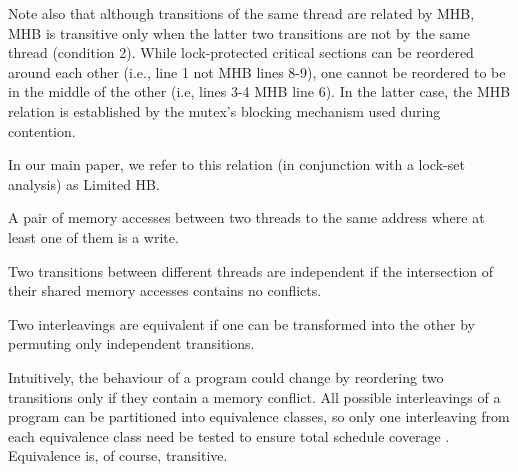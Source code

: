 Note also that although transitions of the same thread are related by MHB,
MHB is transitive only when the latter two transitions are not by the same thread (condition 2).
While lock-protected critical sections can be reordered around each other (i.e., line 1 not MHB lines 8-9),
one cannot be reordered to be in the middle of the other (i.e, lines 3-4 MHB line 6).
In the latter case, the MHB relation is established by the mutex's blocking mechanism used during contention.

In our main paper, we refer to this relation (in conjunction with a lock-set analysis) as Limited HB.

\begin{definition}
A pair of memory accesses between two threads to the same address where at least one of them is a write.
\end{definition}


\begin{definition}
Two transitions between different threads are independent if the intersection of their shared memory accesses contains no conflicts.
\end{definition}

\begin{definition}
Two interleavings are equivalent if one can be transformed into the other by permuting only independent transitions.
\end{definition}

Intuitively, the behaviour of a program could change by reordering two transitions only if they contain a memory conflict.
All possible interleavings of a program can be partitioned into equivalence classes,
so only one interleaving from each equivalence class need be tested to ensure total schedule coverage \cite{mazurkiewicz}.
Equivalence is, of course, transitive.


